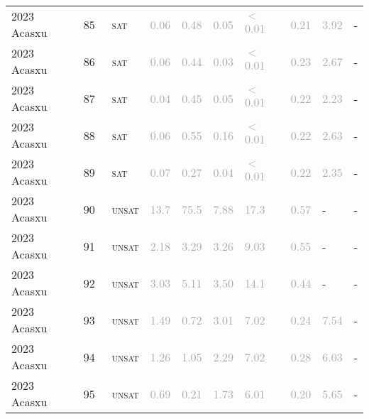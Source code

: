 \begin{center}
{\begin{longtable}{@{}llllllllll@{}}
2023 Acasxu & 85 & ~\textsc{sat} & \textcolor{darkgray}{0.06} & \textcolor{darkgray}{0.48} & \textcolor{darkgray}{0.05} & \textcolor{darkgray}{$<$0.01} & \textcolor{darkgray}{0.21} & \textcolor{darkgray}{3.92} & - \\
2023 Acasxu & 86 & ~\textsc{sat} & \textcolor{darkgray}{0.06} & \textcolor{darkgray}{0.44} & \textcolor{darkgray}{0.03} & \textcolor{darkgray}{$<$0.01} & \textcolor{darkgray}{0.23} & \textcolor{darkgray}{2.67} & - \\
2023 Acasxu & 87 & ~\textsc{sat} & \textcolor{darkgray}{0.04} & \textcolor{darkgray}{0.45} & \textcolor{darkgray}{0.05} & \textcolor{darkgray}{$<$0.01} & \textcolor{darkgray}{0.22} & \textcolor{darkgray}{2.23} & - \\
2023 Acasxu & 88 & ~\textsc{sat} & \textcolor{darkgray}{0.06} & \textcolor{darkgray}{0.55} & \textcolor{darkgray}{0.16} & \textcolor{darkgray}{$<$0.01} & \textcolor{darkgray}{0.22} & \textcolor{darkgray}{2.63} & - \\
2023 Acasxu & 89 & ~\textsc{sat} & \textcolor{darkgray}{0.07} & \textcolor{darkgray}{0.27} & \textcolor{darkgray}{0.04} & \textcolor{darkgray}{$<$0.01} & \textcolor{darkgray}{0.22} & \textcolor{darkgray}{2.35} & - \\
2023 Acasxu & 90 & ~\textsc{unsat} & \textcolor{darkgray}{13.7} & \textcolor{darkgray}{75.5} & \textcolor{darkgray}{7.88} & \textcolor{darkgray}{17.3} & \textcolor{darkgray}{0.57} & - & - \\
2023 Acasxu & 91 & ~\textsc{unsat} & \textcolor{darkgray}{2.18} & \textcolor{darkgray}{3.29} & \textcolor{darkgray}{3.26} & \textcolor{darkgray}{9.03} & \textcolor{darkgray}{0.55} & - & - \\
2023 Acasxu & 92 & ~\textsc{unsat} & \textcolor{darkgray}{3.03} & \textcolor{darkgray}{5.11} & \textcolor{darkgray}{3.50} & \textcolor{darkgray}{14.1} & \textcolor{darkgray}{0.44} & - & - \\
2023 Acasxu & 93 & ~\textsc{unsat} & \textcolor{darkgray}{1.49} & \textcolor{darkgray}{0.72} & \textcolor{darkgray}{3.01} & \textcolor{darkgray}{7.02} & \textcolor{darkgray}{0.24} & \textcolor{darkgray}{7.54} & - \\
2023 Acasxu & 94 & ~\textsc{unsat} & \textcolor{darkgray}{1.26} & \textcolor{darkgray}{1.05} & \textcolor{darkgray}{2.29} & \textcolor{darkgray}{7.02} & \textcolor{darkgray}{0.28} & \textcolor{darkgray}{6.03} & - \\
2023 Acasxu & 95 & ~\textsc{unsat} & \textcolor{darkgray}{0.69} & \textcolor{darkgray}{0.21} & \textcolor{darkgray}{1.73} & \textcolor{darkgray}{6.01} & \textcolor{darkgray}{0.20} & \textcolor{darkgray}{5.65} & - \\

\end{longtable}}
\end{center}
